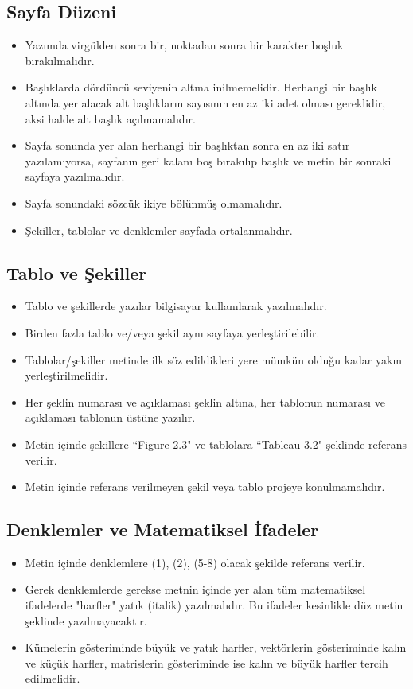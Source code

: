 \subsection{Sayfa Düzeni}
\begin{itemize}
\item Yazımda virgülden sonra bir, noktadan sonra bir karakter boşluk bırakılmalıdır.
\item Başlıklarda dördüncü seviyenin altına inilmemelidir. Herhangi bir başlık altında yer alacak alt başlıkların sayısının en az iki adet olması gereklidir, aksi halde alt başlık açılmamalıdır.
\item Sayfa sonunda yer alan herhangi bir başlıktan sonra en az iki satır yazılamıyorsa, sayfanın geri kalanı boş bırakılıp başlık ve metin bir sonraki sayfaya yazılmalıdır.
\item Sayfa sonundaki sözcük ikiye bölünmüş olmamalıdır. 
\item Şekiller, tablolar ve denklemler sayfada ortalanmalıdır.
\end{itemize}

\subsection{Tablo ve Şekiller}
\begin{itemize}
\item Tablo ve şekillerde yazılar bilgisayar kullanılarak yazılmalıdır.
\item Birden fazla tablo ve/veya şekil aynı sayfaya yerleştirilebilir.
\item Tablolar/şekiller metinde ilk söz edildikleri yere mümkün olduğu kadar yakın yerleştirilmelidir.
\item Her şeklin numarası ve açıklaması şeklin altına, her tablonun numarası ve açıklaması tablonun üstüne yazılır.
\item Metin içinde şekillere ``Figure 2.3" ve tablolara ``Tableau 3.2" şeklinde referans verilir.
\item Metin içinde referans verilmeyen şekil veya tablo projeye konulmamalıdır.
\end{itemize}

\subsection{Denklemler ve Matematiksel İfadeler}
\begin{itemize}
\item Metin içinde denklemlere (1), (2), (5-8) olacak şekilde referans verilir.
\item Gerek denklemlerde gerekse metnin içinde yer alan tüm matematiksel ifadelerde "harfler" yatık (italik) yazılmalıdır. Bu ifadeler kesinlikle düz metin şeklinde yazılmayacaktır.
\item Kümelerin gösteriminde büyük ve yatık harfler, vektörlerin gösteriminde kalın ve küçük harfler, matrislerin gösteriminde ise kalın ve büyük harfler tercih edilmelidir.
\end{itemize}

